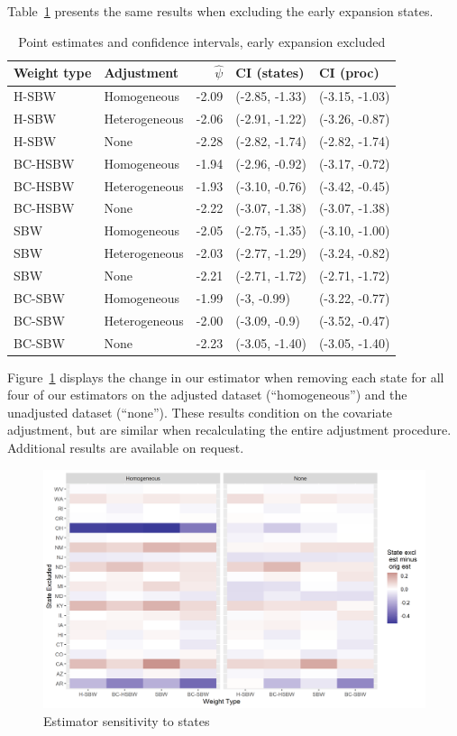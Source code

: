 Table~\ref{tab:confintmainc2} presents the same results when excluding the early expansion states.

\begin{table}[h!]
\centering
\caption{Point estimates and confidence intervals, early expansion excluded}
\label{tab:confintmainc2}
\begin{tabular}{llrll}
  \hline
Weight type & Adjustment & $\hat{\psi}$ & CI (states) & CI (proc) \\ 
  \hline
H-SBW & Homogeneous & -2.09 & (-2.85, -1.33) & (-3.15, -1.03) \\ 
  H-SBW & Heterogeneous & -2.06 & (-2.91, -1.22) & (-3.26, -0.87) \\ 
  H-SBW & None & -2.28 & (-2.82, -1.74) & (-2.82, -1.74) \\ 
  BC-HSBW & Homogeneous & -1.94 & (-2.96, -0.92) & (-3.17, -0.72) \\ 
  BC-HSBW & Heterogeneous & -1.93 & (-3.10, -0.76) & (-3.42, -0.45) \\ 
  BC-HSBW & None & -2.22 & (-3.07, -1.38) & (-3.07, -1.38) \\ 
  SBW & Homogeneous & -2.05 & (-2.75, -1.35) & (-3.10, -1.00) \\ 
  SBW & Heterogeneous & -2.03 & (-2.77, -1.29) & (-3.24, -0.82) \\ 
  SBW & None & -2.21 & (-2.71, -1.72) & (-2.71, -1.72) \\ 
  BC-SBW & Homogeneous & -1.99 & (-3, -0.99) & (-3.22, -0.77) \\ 
  BC-SBW & Heterogeneous & -2.00 & (-3.09, -0.9) & (-3.52, -0.47) \\ 
  BC-SBW & None & -2.23 & (-3.05, -1.40) & (-3.05, -1.40) \\ 
   \hline
\end{tabular}
\end{table}

Figure~\ref{fig:loostateplot} displays the change in our estimator when removing each state for all four of our estimators on the adjusted dataset (``homogeneous'') and the unadjusted dataset (``none''). These results condition on the covariate adjustment, but are similar when recalculating the entire adjustment procedure. Additional results are available on request.

\begin{figure}[H]
\begin{center}
    \caption{Estimator sensitivity to states}
    \label{fig:loostateplot}
    \includegraphics[scale=0.6]{01_Plots/loostate-sensitivityc1-state-uu-i.png}
\end{center}
\end{figure}

\clearpage
